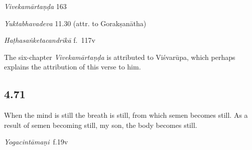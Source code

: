 \begin{ekdosis}
\begin{sources}[hp04_070]
\emph{Vivekamārtaṇḍa} 163
\begin{versinnote}
\end{versinnote}
\end{sources}

\begin{testimonia}[hp04_070]
\emph{Yuktabhavadeva} 11.30 (attr. to Gorakṣanātha)
\begin{versinnote}
\tl{\var{yadā ] tadā}\\!}
\end{versinnote}

\emph{Haṭhasaṅketacandrikā} f.~117v
\begin{versinnote}
\tl{\var{mānasaṃ ca ] B220, mānaseva 2244}\\!}
\end{versinnote}
\end{testimonia}

\begin{philcomm}[hp04_070]
The six-chapter \emph{Vivekamārtaṇḍa} is attributed to Viśvarūpa, which perhaps explains the attribution of this verse to him.
\end{philcomm}

\subsection*{4.71}
\begin{translation}[hp04_071]
When the mind is still the breath is still, from which semen becomes still.  As a result of semen becoming still, my son, the body becomes still.
\end{translation}


\begin{testimonia}[hp04_071]
\emph{Yogacintāmaṇi}~f.19v
\begin{versinnote}
\end{versinnote}


\end{testimonia}
\end{ekdosis}
